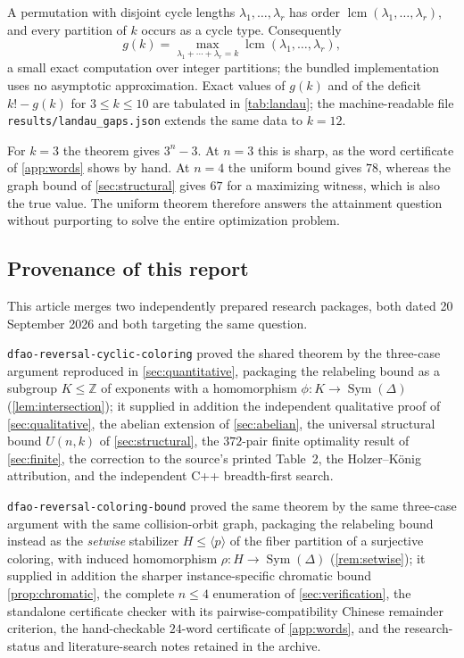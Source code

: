 \documentclass[11pt,a4paper]{article}
\numberwithin{equation}{section}
\theoremstyle{definition}
\theoremstyle{remark}
\newcommand{\Z}{\mathbb Z}
\newcommand{\D}{\Delta}
\newcommand{\Sym}{\operatorname{Sym}}
\newcommand{\lcm}{\operatorname{lcm}}
\begin{document}
A permutation with disjoint cycle lengths $\lambda_1,\ldots,\lambda_r$ has
order $\lcm(\lambda_1,\ldots,\lambda_r)$, and every partition of $k$ occurs
as a cycle type. Consequently
\begin{equation}\label{eq:partitions}
 g(k)=\max_{\lambda_1+\cdots+\lambda_r=k}\lcm(\lambda_1,\ldots,\lambda_r),
\end{equation}
a small exact computation over integer partitions; the bundled
implementation uses no asymptotic approximation. Exact values of $g(k)$ and
of the deficit $k!-g(k)$ for $3\le k\le10$ are tabulated in
\cref{tab:landau}; the machine-readable file
\texttt{results/landau\_gaps.json} extends the same data to $k=12$.

For $k=3$ the theorem gives $3^n-3$. At $n=3$ this is sharp, as the word
certificate of \cref{app:words} shows by hand. At $n=4$ the uniform bound
gives $78$, whereas the graph bound of \cref{sec:structural} gives $67$ for
a maximizing witness, which is also the true value. The uniform theorem
therefore answers the attainment question without purporting to solve the
entire optimization problem.

\subsection{Provenance of this report}\label{sec:provenance}

This article merges two independently prepared research packages, both dated
20 September 2026 and both targeting the same question.

\texttt{dfao-reversal-cyclic-coloring} proved the shared theorem by the
three-case argument reproduced in \cref{sec:quantitative}, packaging the
relabeling bound as a subgroup $K\le\Z$ of exponents with a homomorphism
$\phi:K\to\Sym(\D)$ (\cref{lem:intersection}); it supplied in addition the
independent qualitative proof of \cref{sec:qualitative}, the abelian
extension of \cref{sec:abelian}, the universal structural bound $U(n,k)$ of
\cref{sec:structural}, the $372$-pair finite optimality result of
\cref{sec:finite}, the correction to the source's printed Table~2, the
Holzer--K\"onig attribution, and the independent C++ breadth-first search.

\texttt{dfao-reversal-coloring-bound} proved the same theorem by the same
three-case argument with the same collision-orbit graph, packaging the
relabeling bound instead as the \emph{setwise} stabilizer $H\le\langle
p\rangle$ of the fiber partition of a surjective coloring, with induced
homomorphism $\rho:H\to\Sym(\D)$ (\cref{rem:setwise}); it supplied in
addition the sharper instance-specific chromatic bound
\cref{prop:chromatic}, the complete $n\le4$ enumeration of
\cref{sec:verification}, the standalone certificate checker with its
pairwise-compatibility Chinese remainder criterion, the hand-checkable
$24$-word certificate of \cref{app:words}, and the research-status and
literature-search notes retained in the archive.
\end{document}

